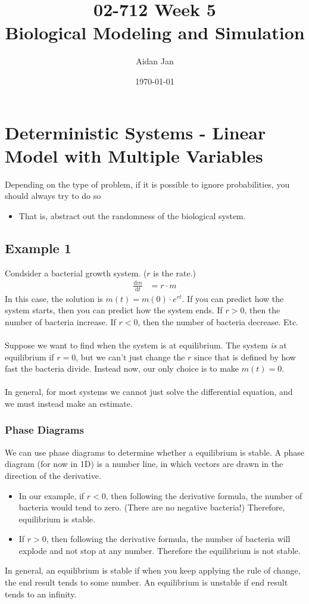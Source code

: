 \documentclass[10pt]{article}
\title{02-712 Week 5 \\ \large{Biological Modeling and Simulation}}
\author{Aidan Jan}
\date{\today}
\newcommand{\dd}{\text{d}}
\begin{document}
\maketitle

\section*{Deterministic Systems - Linear Model with Multiple Variables}
Depending on the type of problem, if it is possible to ignore probabilities, you should always try to do so
\begin{itemize}
	\item That is, abstract out the randomness of the biological system.
\end{itemize}

\subsection*{Example 1}
Condsider a bacterial growth system.  ($r$ is the rate.)
\begin{align*}
    \frac{\dd m}{\dd t} &= r \cdot m
\end{align*}
In this case, the solution is $m(t) = m(0) \cdot e^{rt}$.  If you can predict how the system starts, then you can predict how the system ends.  If $r > 0$, then the number of bacteria increase.  If $r < 0$, then the number of bacteria decrease.  Etc.\\\\
Suppose we want to find when the system is at equilibrium.  The system \textit{is} at equilibrium if $r = 0$, but we can't just change the $r$ since that is defined by how fast the bacteria divide.  Instead now, our only choice is to make $m(t) = 0$.\\\\
In general, for most systems we cannot just solve the differential equation, and we must instead make an estimate.

\subsubsection*{Phase Diagrams}
We can use phase diagrams to determine whether a equilibrium is stable.  A phase diagram (for now in 1D) is a number line, in which vectors are drawn in the direction of the derivative.  
\begin{itemize}
	\item In our example, if $r < 0$, then following the derivative formula, the number of bacteria would tend to zero.  (There are no negative bacteria!)  Therefore, equilibrium is stable.
	\item If $r > 0$, then following the derivative formula, the number of bacteria will explode and not stop at any number.  Therefore the equilibrium is not stable.
\end{itemize}
In general, an equilibrium is stable if when you keep applying the rule of change, the end result tends to some number.  An equilibrium is unstable if end result tends to an infinity.
\end{document}
